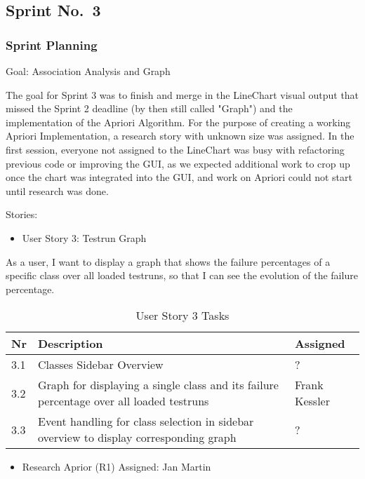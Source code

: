 \subsection{Sprint No.~3}

\subsubsection*{Sprint Planning}

Goal: Association Analysis and Graph

The goal for Sprint 3 was to finish and merge in the LineChart visual output that missed the Sprint 2 deadline (by then still called "Graph") and the implementation of the Apriori Algorithm. 
For the purpose of creating a working Apriori Implementation, a research story with unknown size was assigned. 
In the first session, everyone not assigned to the LineChart was busy with refactoring previous code or improving the GUI, as we expected additional work to crop up once the chart was integrated into the GUI, and work on Apriori could not start until research was done.

Stories: 

\begin{itemize}
	\item User Story 3: Testrun Graph
	\end{itemize}
As a user,
I want to display a graph that shows the failure percentages of a specific class over all loaded testruns, so that I can see the evolution of the failure percentage.
\begin{table}[h]
  \caption{User Story 3 Tasks}
  \label{Story ? Tasks}
  \centering
  \begin{tabular}{p{1cm}|p{5cm}|p{3cm}|}
  	Nr & Description & Assigned \\ 
  	\hline
  	3.1 & Classes Sidebar Overview & ? \\ 
  	\hline
  	3.2 & Graph for displaying a single class and its failure percentage over all loaded testruns & Frank Kessler \\ 
  	\hline
  	3.3 & Event handling for class selection in sidebar overview to display corresponding graph & ? \\ 
  	\hline
  \end{tabular}
\end{table}
	
\begin{itemize}	
	\item Research Aprior (R1) Assigned: Jan Martin
\end{itemize}

